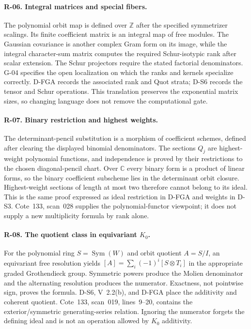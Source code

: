 \paragraph{R-06. Integral matrices and special fibers.}
The polynomial orbit map is defined over $\mathbb Z$ after the specified symmetrizer scalings. Its finite coefficient matrix is an integral map of free modules. The Gaussian covariance is another complex Gram form on its image, while the integral character-sum matrix computes the required Schur-isotypic rank after scalar extension. The Schur projectors require the stated factorial denominators. G-04 specifies the open localization on which the ranks and kernels specialize correctly. D-FGA records the associated rank and Quot strata; D-S6 records the tensor and Schur operations. This translation preserves the exponential matrix sizes, so changing language does not remove the computational gate.

\paragraph{R-07. Binary restriction and highest weights.}
The determinant-pencil substitution is a morphism of coefficient schemes, defined after clearing the displayed binomial denominators. The sections $Q_j$ are highest-weight polynomial functions, and independence is proved by their restrictions to the chosen diagonal-pencil chart. Over $\mathbb C$ every binary form is a product of linear forms, so the binary coefficient subscheme lies in the determinant orbit closure. Highest-weight sections of length at most two therefore cannot belong to its ideal. This is the same proof expressed as ideal restriction in D-FGA and weights in D-S3. Cote~133, scan~028 supplies the polynomial-functor viewpoint; it does not supply a new multiplicity formula by rank alone.

\paragraph{R-08. The quotient class in equivariant $K_0$.}
For the polynomial ring $S=\operatorname{Sym}(W)$ and orbit quotient $A=S/I$, an equivariant free resolution yields $[A]=\sum_i(-1)^i[S\otimes T_i]$ in the appropriate graded Grothendieck group. Symmetric powers produce the Molien denominator and the alternating resolution produces the numerator. Exactness, not pointwise sign, proves the formula. D-S6, V~2.2(b), and D-FGA place the additivity and coherent quotient. Cote~133, scan~019, lines~9--20, contains the exterior/symmetric generating-series relation. Ignoring the numerator forgets the defining ideal and is not an operation allowed by $K_0$ additivity.

